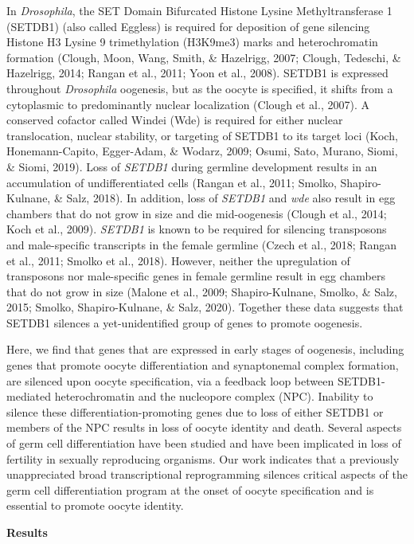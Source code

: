\documentclass[12pt,oneside]{reedthesis}
\begin{document}
In \emph{Drosophila}, the {SET} {D}omain
{B}ifurcated Histone Lysine Methyltransferase 1 (SETDB1)
(also called Eggless) is required for deposition of gene silencing
Histone H3 Lysine 9 trimethylation (H3K9me3) marks and heterochromatin
formation (Clough, Moon, Wang, Smith, \& Hazelrigg, 2007; Clough, Tedeschi, \& Hazelrigg, 2014; Rangan et al., 2011; Yoon et al., 2008). SETDB1
is expressed throughout \emph{Drosophila} oogenesis, but as the oocyte is
specified, it shifts from a cytoplasmic to predominantly nuclear
localization (Clough et al., 2007). A conserved
cofactor called Windei (Wde) is required for either nuclear
translocation, nuclear stability, or targeting of SETDB1 to its target
loci (Koch, Honemann-Capito, Egger-Adam, \& Wodarz, 2009; Osumi, Sato, Murano, Siomi, \& Siomi, 2019). Loss of \emph{SETDB1} during germline
development results in an accumulation of undifferentiated cells
(Rangan et al., 2011; Smolko, Shapiro-Kulnane, \& Salz, 2018). In addition, loss of \emph{SETDB1}
and \emph{wde} also result in egg chambers that do not grow in size and die
mid-oogenesis (Clough et al., 2014; Koch et al., 2009). \emph{SETDB1} is known to be required
for silencing transposons and male-specific transcripts in the female
germline (Czech et al., 2018; Rangan et al., 2011; Smolko et al., 2018). However, neither the
upregulation of transposons nor male-specific genes in female germline
result in egg chambers that do not grow in size
(Malone et al., 2009; Shapiro-Kulnane, Smolko, \& Salz, 2015; Smolko, Shapiro-Kulnane, \& Salz, 2020). Together these data
suggests that SETDB1 silences a yet-unidentified group of genes to
promote oogenesis.

Here, we find that genes that are expressed in early stages of
oogenesis, including genes that promote oocyte differentiation and
synaptonemal complex formation, are silenced upon oocyte specification,
via a feedback loop between SETDB1-mediated heterochromatin and the
nucleopore complex (NPC). Inability to silence these
differentiation-promoting genes due to loss of either SETDB1 or members
of the NPC results in loss of oocyte identity and death. Several aspects
of germ cell differentiation have been studied and have been implicated
in loss of fertility in sexually reproducing organisms. Our work
indicates that a previously unappreciated broad transcriptional
reprogramming silences critical aspects of the germ cell differentiation
program at the onset of oocyte specification and is essential to promote
oocyte identity.

\textbf{Results}
\end{document}

